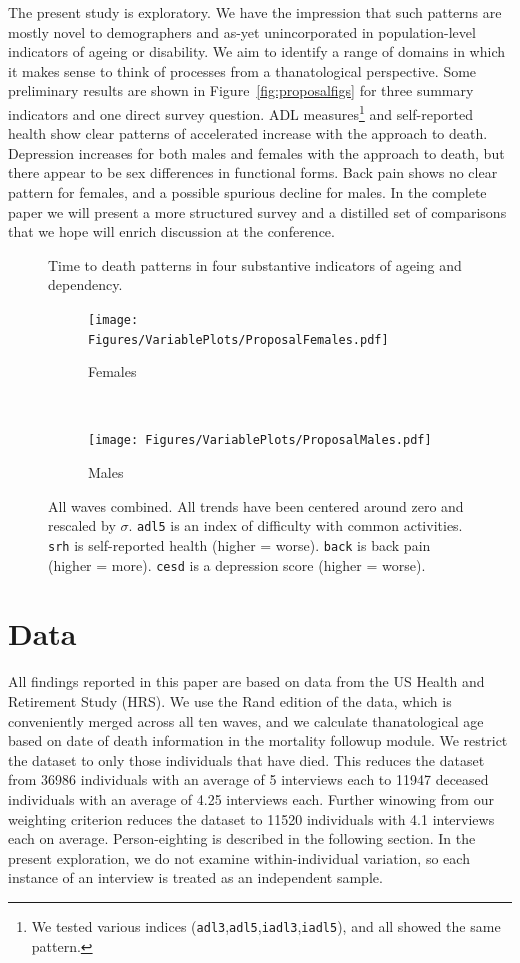 \documentclass{article}
\begin{document}
The present study is exploratory. We have the impression
that such patterns are mostly novel to demographers and as-yet unincorporated in
population-level indicators of ageing or disability. We aim to identify a
range of domains in which it makes sense to think of processes from a
thanatological perspective. Some preliminary results are shown in
Figure~\ref{fig:proposalfigs} for three summary indicators and one direct survey
question. ADL measures\footnote{We tested various indices
(\texttt{adl3},\texttt{adl5},\texttt{iadl3},\texttt{iadl5}), and all showed the
same pattern.} and self-reported health show clear patterns of
accelerated increase with the approach to death. Depression increases for both
males and females with the approach to death, but there appear to be sex
differences in functional forms. Back pain shows no clear pattern for females,
and a possible spurious decline for males. In the complete paper we will present a
more structured survey and a distilled set of comparisons that we hope will
enrich discussion at the conference. 

\begin{figure}
\centering
\caption{Time to death patterns in four substantive indicators of ageing and
dependency.}
\label{fig:proposalfigs}
\begin{subfigure}[b]{.47\linewidth}
\centering
	\caption{Females}
	\label{fig:females}
	\texttt{[image: Figures/VariablePlots/ProposalFemales.pdf]}	
\end{subfigure}
~
\begin{subfigure}[b]{.47\linewidth}
\centering
    \caption{Males}
	\label{fig:ales}
    \texttt{[image: Figures/VariablePlots/ProposalMales.pdf]}
\end{subfigure}
\caption{All waves combined. All trends have been centered around zero and
rescaled by $\sigma$. \texttt{adl5} is an index of difficulty with common
activities. \texttt{srh} is self-reported health (higher = worse).
\texttt{back} is back pain (higher = more). \texttt{cesd} is a depression score
(higher = worse).}
\end{figure}

\section{Data}
All findings reported in this paper are based on data from the US Health and
Retirement Study (HRS). We use the Rand edition of the data, which is
conveniently merged across all ten waves, and we calculate thanatological age
based on date of death information in the mortality followup module. We
restrict the dataset to only those individuals that have died. This reduces the
dataset from 36986 individuals with an average of 5 interviews each to 11947
deceased individuals with an average of 4.25 interviews each. Further winowing
from our weighting criterion reduces the dataset to
11520 individuals with 4.1 interviews each on average. Person-eighting is
described in the following section. In the present exploration, we do not examine
within-individual variation, so each instance of an interview is treated as an independent sample.
\end{document}
